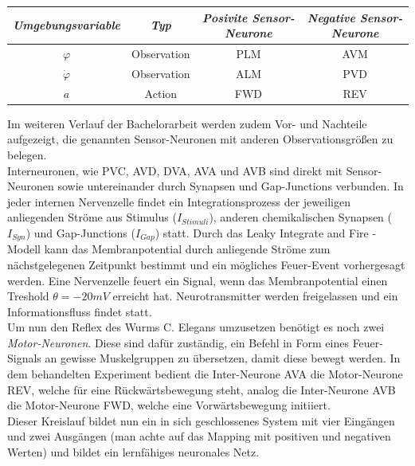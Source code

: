 	\begin{center}
	\begin{tabular}{c@{\hskip 0.5cm}c@{\hskip 0.5cm}c@{\hskip 0.5cm}c}    \toprule
		\setlength{\tabcolsep}{50pt}
		\renewcommand{\arraystretch}{1.5}
		\emph{Umgebungsvariable} & \emph{Typ}  & \emph{Posivite Sensor-Neurone} & \emph{Negative Sensor-Neurone} \\\midrule
		$\varphi$ 				 & Observation & PLM							& AVM							 \\ 
		$\dot{\varphi}$		 	 & Observation & ALM							& PVD							 \\
		$a$						 & Action	   & FWD							& REV							 \\\bottomrule
		\hline
	\end{tabular}
	\end{center}
	Im weiteren Verlauf der Bachelorarbeit werden zudem Vor- und Nachteile aufgezeigt, die genannten Sensor-Neuronen mit anderen Observationsgrößen zu belegen.\\
	Interneuronen, wie PVC, AVD, DVA, AVA und AVB sind direkt mit Sensor-Neuronen sowie untereinander durch Synapsen und Gap-Junctions verbunden. In jeder internen Nervenzelle findet ein Integrationsprozess der jeweiligen anliegenden Ströme aus Stimulus ($I_{Stimuli}$), anderen chemikalischen Synapsen ($I_{Syn}$) und Gap-Junctions ($I_{Gap}$) statt. Durch das Leaky Integrate and Fire - Modell kann das Membranpotential durch anliegende Ströme zum nächstgelegenen Zeitpunkt bestimmt und ein mögliches Feuer-Event vorhergesagt werden. Eine Nervenzelle feuert ein Signal, wenn das Membranpotential einen Treshold $\theta = -20mV$ erreicht hat. Neurotransmitter werden freigelassen und ein Informationsfluss findet statt.\\
	Um nun den Reflex des Wurms C. Elegans umzusetzen benötigt es noch zwei \textit{Motor-Neuronen}. Diese sind dafür zuständig, ein Befehl in Form eines Feuer-Signals an gewisse Muskelgruppen zu übersetzen, damit diese bewegt werden. In dem behandelten Experiment bedient die Inter-Neurone AVA die Motor-Neurone REV, welche für eine Rückwärtsbewegung steht, analog die Inter-Neurone AVB die Motor-Neurone FWD, welche eine Vorwärtsbewegung initiiert.\\
	Dieser Kreislauf bildet nun ein in sich geschlossenes System mit vier Eingängen und zwei Ausgängen (man achte auf das Mapping mit positiven und negativen Werten) und bildet ein lernfähiges neuronales Netz.
